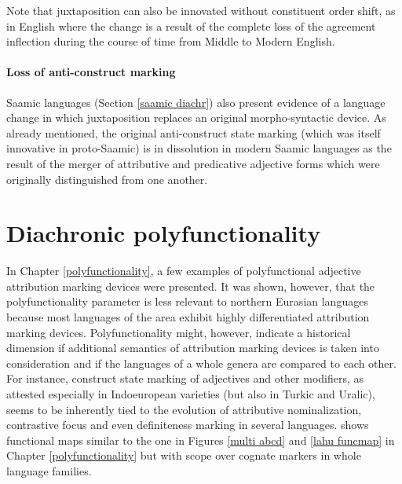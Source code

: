 {Note that juxtaposition can also be innovated without constituent order shift, as in English where the change is a result of the complete loss of the agreement inflection during the course of time from Middle to Modern English. 

\paragraph{Loss of anti-construct marking}
Saamic languages (Section \ref{saamic diachr}) also present evidence of a language change in which juxtaposition replaces an original morpho-syntactic device. As already mentioned, the original anti-construct state marking (which was itself innovative in proto-Saamic) is in dissolution in modern Saamic languages as the result of the merger of attributive and predicative adjective forms which were originally distinguished from one another.

\section{Diachronic polyfunctionality}
In Chapter \ref{polyfunctionality}, a few examples of polyfunctional adjective attribution marking devices were presented. It was shown, however, that the polyfunctionality parameter is less relevant to northern Eurasian languages because most languages of the area exhibit highly differentiated attribution marking devices. Polyfunctionality might, however, indicate a historical dimension if additional semantics of attribution marking devices is taken into consideration and if the languages of a whole genera are compared to each other. For instance, construct state marking of adjectives and other modifiers, as attested especially in Indoeuropean varieties (but also in Turkic and Uralic), seems to be inherently tied to the evolution of attributive nominalization, contrastive focus and even definiteness marking in several languages.  shows functional maps similar to the one in Figures \ref{multi abcd} and \ref{lahu funcmap} in Chapter \ref{polyfunctionality} but with scope over cognate markers in whole language families.

}

